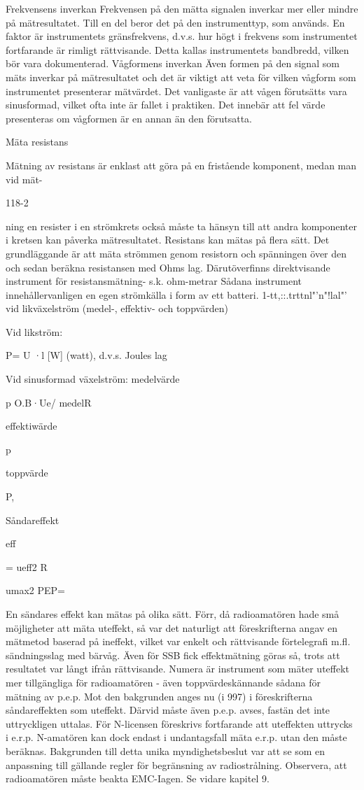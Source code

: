 Frekvensens inverkan
Frekvensen på den mätta signalen inverkar
mer eller mindre på mätresultatet. Till en del
beror det på den instrumenttyp, som används. En faktor är instrumentets gränsfrekvens, d.v.s. hur högt i frekvens som instrumentet fortfarande är rimligt rättvisande. Detta
kallas instrumentets bandbredd, vilken bör
vara dokumenterad.
Vågformens inverkan
Även formen på den signal som mäts inverkar på mätresultatet och det är viktigt att veta
för vilken vågform som instrumentet presenterar mätvärdet. Det vanligaste är att vågen
förutsätts vara sinusformad, vilket ofta inte är
fallet i praktiken. Det innebär att fel värde
presenteras om vågformen är en annan än
den förutsatta.

Mäta resistans

Mätning av resistans är enklast att göra på en
fristående komponent, medan man vid mät-

118-2

ning
en resister i en strömkrets också
måste ta hänsyn till att andra komponenter i
kretsen kan påverka mätresultatet.
Resistans kan mätas på flera sätt. Det
grundläggande är att mäta strömmen genom resistorn och spänningen över den och
sedan beräkna resistansen med Ohms lag.
Därutöverfinns direktvisande instrument
för resistansmätning- s.k. ohm-metrar Sådana instrument innehållervanligen en egen
strömkälla i form av ett batteri.
1-tt,::.trttnl"'n"!lal"' vid likväxelström
(medel-, effektiv- och toppvärden)

Vid likström:

P= U ·l [W] (watt),
d.v.s. Joules lag

Vid sinusformad växelström:
medelvärde

p
 O.B·Ue/
medelR

effektiwärde

p

toppvärde

P,

Såndareffekt

eff

= ueff2
R

umax2
PEP=~

En sändares effekt kan mätas på olika sätt.
Förr, då radioamatören hade små möjligheter att mäta uteffekt, så var det naturligt att
föreskrifterna angav en mätmetod baserad
på ineffekt, vilket var enkelt och rättvisande
förtelegrafi m.fl. sändningsslag med bärvåg.
Även för SSB fick effektmätning göras så,
trots att resultatet var långt ifrån rättvisande.
Numera är instrument som mäter uteffekt
mer tillgängliga för radioamatören - även
toppvärdeskännande sådana för mätning av
p.e.p. Mot den bakgrunden anges nu (i 997)
i föreskrifterna såndareffekten som uteffekt.
Därvid måste även p.e.p. avses, fastän det
inte uttryckligen uttalas.
För N-licensen föreskrivs fortfarande att
uteffekten uttrycks i e.r.p. N-amatören kan
dock endast i undantagsfall mäta e.r.p. utan
den måste beräknas. Bakgrunden till detta
unika myndighetsbeslut var att se som en
anpassning till gällande regler för begränsning av radiostrålning.
Observera, att radioamatören måste beakta EMC-Iagen. Se vidare kapitel 9.

